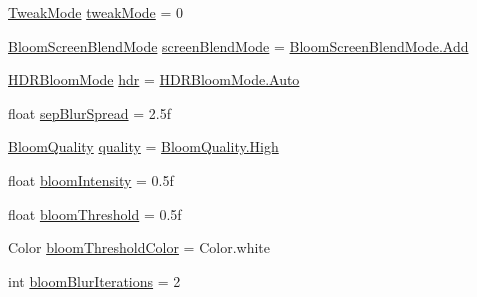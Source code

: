 \begin{DoxyCompactItemize}
\item 
\mbox{\hyperlink{class_unity_standard_assets_1_1_image_effects_1_1_bloom_a347c36b6b2157676e03ad0d9b18a27fd}{Tweak\+Mode}} \mbox{\hyperlink{class_unity_standard_assets_1_1_image_effects_1_1_bloom_a1da5c25475bbf245bf480a8f7108c50e}{tweak\+Mode}} = 0
\item 
\mbox{\hyperlink{class_unity_standard_assets_1_1_image_effects_1_1_bloom_aa4397c9399f598ffb4b75a1a49501718}{Bloom\+Screen\+Blend\+Mode}} \mbox{\hyperlink{class_unity_standard_assets_1_1_image_effects_1_1_bloom_a9839cb699eb7236b821df49927dbd767}{screen\+Blend\+Mode}} = \mbox{\hyperlink{class_unity_standard_assets_1_1_image_effects_1_1_bloom_aa4397c9399f598ffb4b75a1a49501718aec211f7c20af43e742bf2570c3cb84f9}{Bloom\+Screen\+Blend\+Mode.\+Add}}
\item 
\mbox{\hyperlink{class_unity_standard_assets_1_1_image_effects_1_1_bloom_a1178b6e7394c2a01d13ae4e8f46abb32}{H\+D\+R\+Bloom\+Mode}} \mbox{\hyperlink{class_unity_standard_assets_1_1_image_effects_1_1_bloom_a0d7cf39f98d61e8339d4bc71176def9b}{hdr}} = \mbox{\hyperlink{class_unity_standard_assets_1_1_image_effects_1_1_bloom_a1178b6e7394c2a01d13ae4e8f46abb32a06b9281e396db002010bde1de57262eb}{H\+D\+R\+Bloom\+Mode.\+Auto}}
\item 
float \mbox{\hyperlink{class_unity_standard_assets_1_1_image_effects_1_1_bloom_a4083416b05757f931884bbdcf4e6d562}{sep\+Blur\+Spread}} = 2.\+5f
\item 
\mbox{\hyperlink{class_unity_standard_assets_1_1_image_effects_1_1_bloom_a38ac8039f8a9f5246ce838730d19efcc}{Bloom\+Quality}} \mbox{\hyperlink{class_unity_standard_assets_1_1_image_effects_1_1_bloom_a466b0e4e815af732ce073d17e9704c66}{quality}} = \mbox{\hyperlink{class_unity_standard_assets_1_1_image_effects_1_1_bloom_a38ac8039f8a9f5246ce838730d19efcca655d20c1ca69519ca647684edbb2db35}{Bloom\+Quality.\+High}}
\item 
float \mbox{\hyperlink{class_unity_standard_assets_1_1_image_effects_1_1_bloom_aef10a8ab188a0ddf9b765f85cb5b609e}{bloom\+Intensity}} = 0.\+5f
\item 
float \mbox{\hyperlink{class_unity_standard_assets_1_1_image_effects_1_1_bloom_a728f4244c0570b9d6f3e1558047c557c}{bloom\+Threshold}} = 0.\+5f
\item 
Color \mbox{\hyperlink{class_unity_standard_assets_1_1_image_effects_1_1_bloom_a164da9c081eedbf4bc605dd1698058d2}{bloom\+Threshold\+Color}} = Color.\+white
\item 
int \mbox{\hyperlink{class_unity_standard_assets_1_1_image_effects_1_1_bloom_ab9ec9392993250111d564d78873db16b}{bloom\+Blur\+Iterations}} = 2

\end{DoxyCompactItemize}
